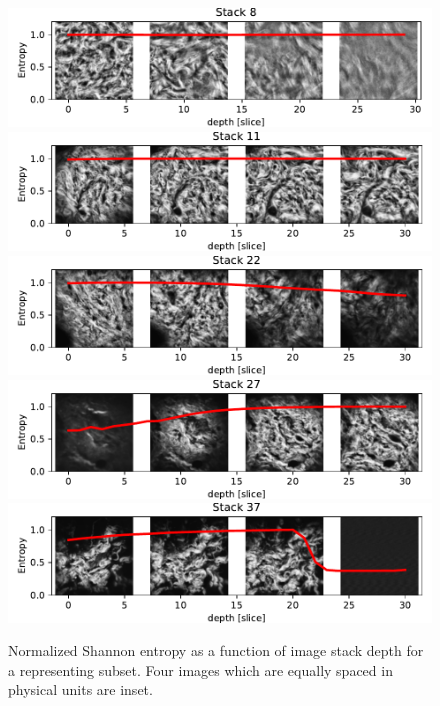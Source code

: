 \begin{figure}
    \centering
    \includegraphics[width=\linewidth]{skinstression/images/entropy/8.pdf} \\
    \includegraphics[width=\linewidth]{skinstression/images/entropy/11.pdf} \\
    \includegraphics[width=\linewidth]{skinstression/images/entropy/22.pdf} \\
    \includegraphics[width=\linewidth]{skinstression/images/entropy/27.pdf} \\
    \includegraphics[width=\linewidth]{skinstression/images/entropy/37.pdf}
    \caption[Shannon entropy vs image stack depth]{
        Normalized Shannon entropy as a function of image stack depth for a representing subset.
        Four images which are equally spaced in physical units are inset.
    }
    \label{fig:skin_entropy_depth}
\end{figure}

